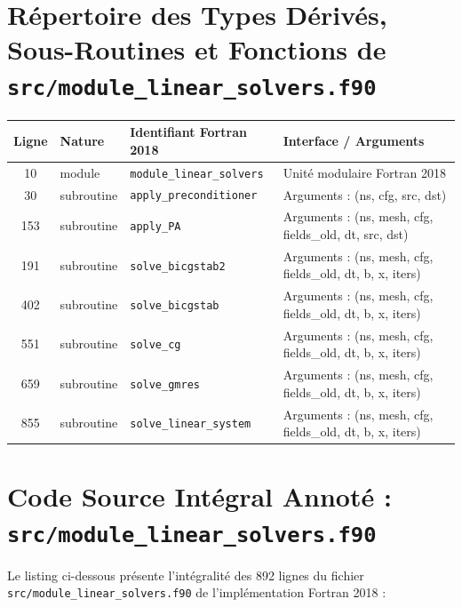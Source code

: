\documentclass[10pt,a4paper,oneside]{book}
\begin{document}
\section{Répertoire des Types Dérivés, Sous-Routines et Fonctions de \texttt{src/module\_linear\_solvers.f90}}
\begin{center}\small
\begin{tabular}{clll}
\toprule
\textbf{Ligne} & \textbf{Nature} & \textbf{Identifiant Fortran 2018} & \textbf{Interface / Arguments} \\
\midrule
10 & module & \texttt{module\_linear\_solvers} & Unité modulaire Fortran 2018 \\
30 & subroutine & \texttt{apply\_preconditioner} & Arguments : (ns, cfg, src, dst) \\
153 & subroutine & \texttt{apply\_PA} & Arguments : (ns, mesh, cfg, fields\_old, dt, src, dst) \\
191 & subroutine & \texttt{solve\_bicgstab2} & Arguments : (ns, mesh, cfg, fields\_old, dt, b, x, iters) \\
402 & subroutine & \texttt{solve\_bicgstab} & Arguments : (ns, mesh, cfg, fields\_old, dt, b, x, iters) \\
551 & subroutine & \texttt{solve\_cg} & Arguments : (ns, mesh, cfg, fields\_old, dt, b, x, iters) \\
659 & subroutine & \texttt{solve\_gmres} & Arguments : (ns, mesh, cfg, fields\_old, dt, b, x, iters) \\
855 & subroutine & \texttt{solve\_linear\_system} & Arguments : (ns, mesh, cfg, fields\_old, dt, b, x, iters) \\
\bottomrule
\end{tabular}
\end{center}

\section{Code Source Intégral Annoté : \texttt{src/module\_linear\_solvers.f90}}
Le listing ci-dessous présente l'intégralité des 892 lignes du fichier \texttt{src/module\_linear\_solvers.f90} de l'implémentation Fortran 2018 :
\end{document}
